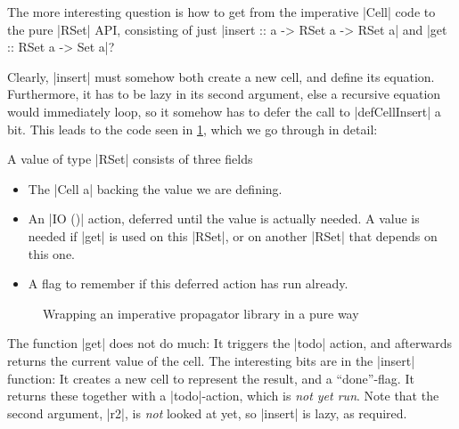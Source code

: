 \documentclass[manuscript,screen,acmsmall,nonacm]{acmart}
\begin{document}
The more interesting question is how to get from the imperative |Cell| code to the pure |RSet| API, consisting of just |insert :: a -> RSet a -> RSet a| and |get :: RSet a -> Set a|?

Clearly, |insert| must somehow both create a new cell, and define its equation.
Furthermore, it has to be lazy in its second argument, else a recursive equation would immediately loop, so it somehow has to defer the call to |defCellInsert| a bit. This leads to the code seen in \cref{fig:wrap}, which we go through in detail:

A value of type |RSet| consists of three fields
\begin{itemize}
\item The |Cell a| backing the value we are defining.
\item An |IO ()| action, deferred until the value is actually needed. A value is needed if |get| is used on this |RSet|, or on another |RSet| that depends on this one.
\item A flag to remember if this deferred action has run already.
\end{itemize}


\begin{figure}%
\setlength{\abovedisplayskip}{0pt}%
\setlength{\belowdisplayskip}{0pt}%
\raggedright%
%
\caption{Wrapping an imperative propagator library in a pure way}\label{fig:wrap}
\end{figure}

The function |get| does not do much: It triggers the |todo| action, and afterwards returns the current value of the cell. The interesting bits are in the |insert| function: It creates a new cell to represent the result, and a “done”-flag. It returns these together with a |todo|-action, which is \emph{not yet run}. Note that the second argument, |r2|, is \emph{not} looked at yet, so |insert| is lazy, as required.
\end{document}

